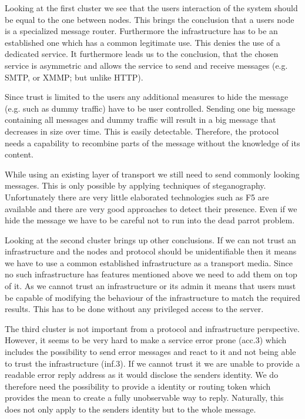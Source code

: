 \documentclass[12pt,journal,compsoc,peerreview]{IEEEtran}
\begin{document}
Looking at the first cluster we see that the users interaction of the system should be equal to the one between nodes. This brings the conclusion that a users node is a specialized message router. Furthermore the infrastructure has to be an established one which has a common legitimate use. This denies the use of a dedicated service. It furthermore leads us to the conclusion, that the chosen service is asymmetric and allows the service to send and receive messages (e.g. SMTP, or XMMP; but unlike HTTP). 
\par
Since trust is limited to the users any additional measures to hide the message (e.g. such as dummy traffic) have to be user controlled. Sending one big message containing all messages and dummy traffic will result in a big message that decreases in size over time. This is easily detectable. Therefore, the protocol needs a capability to recombine parts of the message without the knowledge of its content.
\par
While using an existing layer of transport we still need to send commonly looking messages. This is only possible by applying techniques of steganography. Unfortunately there are very little elaborated technologies such as F5\cite{f5} are available and there are very good approaches to detect their presence\cite{steganalysisf5}. Even if we hide the message we have to be careful not to run into the dead parrot problem\cite{oakland2013-parrot}.
\par
Looking at the second cluster brings up other conclusions. If we can not trust an infrastructure and the nodes and protocol should be unidentifiable then it means we have to use a common established infrastructure as a transport media. Since no such infrastructure has features mentioned above we need to add them on top of it. As we cannot trust an infrastructure or its admin it means that users must be capable of modifying the behaviour of the infrastructure to match the required results. This has to be done without any privileged access to the server.
\par
The third cluster is not important from a protocol and infrastructure perspective. However, it seems to be very hard to make a service error prone (acc.3) which includes the possibility to send error messages and react to it and not being able to trust the infrastructure (inf.3). If we cannot trust it we are unable to provide a readable error reply address as it would disclose the senders identity. We do therefore need the possibility to provide a identity or routing token which provides the mean to create a fully unobservable way to reply. Naturally, this does not only apply to the senders identity but to the whole message.
\end{document}
